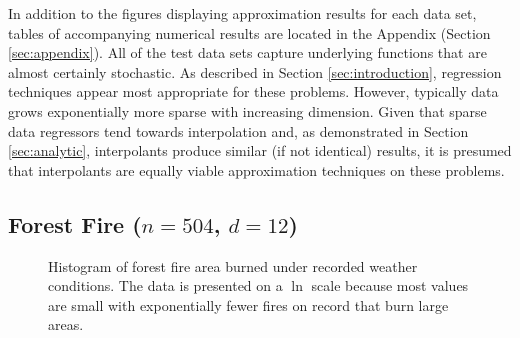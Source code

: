 \documentclass[smallextended,final]{svjour3}  %
\begin{document}
In addition to the figures displaying approximation results for each
data set, tables of accompanying numerical results are located in the
Appendix (Section \ref{sec:appendix}). All of the test data sets
capture underlying functions that are almost certainly stochastic. As
described in Section \ref{sec:introduction}, regression techniques
appear most appropriate for these problems. However, typically data
grows exponentially more sparse with increasing dimension. Given that
sparse data regressors tend towards interpolation and, as demonstrated
in Section \ref{sec:analytic}, interpolants produce similar (if not
identical) results, it is presumed that interpolants are equally
viable approximation techniques on these problems.

\subsection{Forest Fire ($n = 504$, $d = 12$)}

\begin{figure}
  \centering
  \caption{Histogram of forest fire area burned under recorded weather
    conditions. The data is presented on a $\ln$ scale because
    most values are small with exponentially fewer fires on record
    that burn large areas.}
  \label{fig:hist-forest-fire}
\end{figure}
\end{document}
